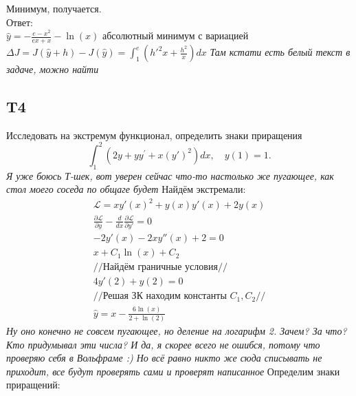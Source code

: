 \documentclass{article}
\newcommand{\Lagr}{\mathcal{L}}
\begin{document}
Минимум, получается.\\
Ответ: \\
$\hat y = -\frac{e-x^2}{e x+x}-\ln (x)$  абсолютный минимум с вариацией $\Delta J = J(\hat y + h) - J(\hat y) =\int_1^e  \left(h'^2 x +\frac{h^2}{x} \right) dx$ 
 \textcolor[rgb]{0.480469,0.566406,0.480469}{\textit{Там кстати есть белый текст в задаче, можно найти}}                                               

\subsection{T4}
Исследовать на экстремум функционал, определить знаки приращения
\begin{equation}
    \int_{1}^{2}\left(2 y+y y^{\prime}+x\left(y'\right)^2\right) d x, \quad y(1)=1 .
\end{equation}
 \textcolor[rgb]{0.480469,0.566406,0.480469}{\textit{Я уже боюсь Т-шек, вот уверен сейчас что-то настолько же пугающее, как стол моего соседа по общаге будет}}  
 Найдём экстремали:
 \begin{gather*}
    \Lagr = x y'(x)^2+y(x) y'(x)+2 y(x)\\
    \frac{\partial \Lagr}{\partial y}  - \frac{d }{d x} \frac{\partial \Lagr}{\partial y'} =0   \\
    -2 y'(x)-2 x y''(x)+2=0\\
    x+C_1 \ln (x)+C_2\\
    //\text{Найдём граничные условия}//\\
    4 y'(2)+y(2) = 0\\
    //\text{Решая ЗК находим константы } C_1, C_2//\\
    \hat y=x-\frac{6 \ln (x)}{2+\ln (2)}
 \end{gather*}  
 \textcolor[rgb]{0.480469,0.566406,0.480469}{\textit{Ну оно конечно не совсем пугающее, но деление на логарифм 2. Зачем? За что? Кто придумывал эти числа? И да, я скорее всего не ошибся, потому что проверяю себя в Вольфраме :) Но всё равно никто же сюда списывать не приходит, все будут проверять сами и проверят написанное}}
 Определим знаки приращений:
\end{document}
